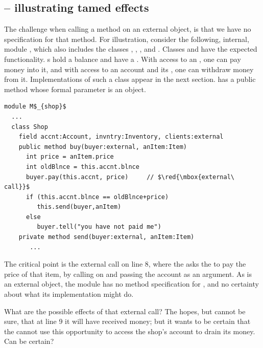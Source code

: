  

\subsection*{ -- illustrating tamed effects} %
\label{sec:how}
\label{sec:shop}

The challenge when calling a method on an external object, is that we have no specification for that method. 
 For illustration, consider the following, internal, module \Mshop, which also includes the classes , , , and . 
Classes  { and  have the expected functionality. 
s hold a balance and have a \password. 
With access to an , %
one  can pay money into it, 
and with access to an account  and its \password, one can withdraw money from it.
Implementations of such a class  appear in the next section.
}
   has  a public method  whose formal parameter  is an    object. 

\begin{lstlisting}[mathescape=true, language=Chainmail, frame=lines]
module M$_{shop}$
  ...   
  class Shop
    field accnt:Account, invntry:Inventory, clients:external      
    public method buy(buyer:external, anItem:Item)
      int price = anItem.price
      int oldBlnce = this.accnt.blnce
      buyer.pay(this.accnt, price)     // $\red{\mbox{external\ call}}$
      if (this.accnt.blnce == oldBlnce+price)  
         this.send(buyer,anItem)
      else
         buyer.tell("you have not paid me")      
    private method send(buyer:external, anItem:Item)  
       ...         
\end{lstlisting}
 

The critical point is the external call on line 8,   {where the  asks the  to pay the price of that item,
by calling   on  and passing the  account as an argument.
As  is an external object, the module \Mshop has no method specification for , and no 
certainty about what its implementation %
might do. 
}

{What are the possible effects of that external call?}
{The  hopes, but cannot be sure, that at line 9  it  will have received money; but 
it wants to be certain  that the  cannot use this opportunity to access the 
shop's account to drain its money.
Can   be certain?}

